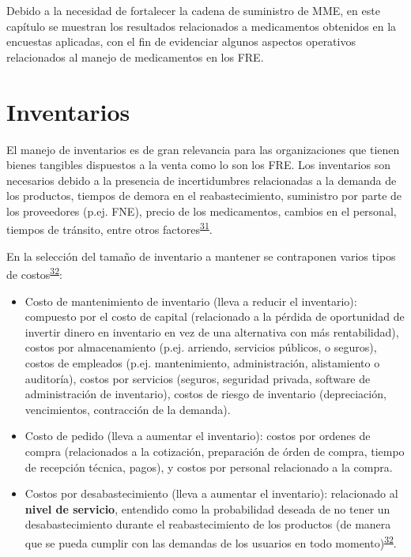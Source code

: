 \documentclass[
]{book}
\begin{document}
Debido a la necesidad de fortalecer la cadena de suministro de MME, en este capítulo se muestran los resultados relacionados a medicamentos obtenidos en la encuestas aplicadas, con el fin de evidenciar algunos aspectos operativos relacionados al manejo de medicamentos en los FRE.

\hypertarget{inventarios}{%
\section{Inventarios}\label{inventarios}}


El manejo de inventarios es de gran relevancia para las organizaciones que tienen bienes tangibles dispuestos a la venta como lo son los FRE. Los inventarios son necesarios debido a la presencia de incertidumbres relacionadas a la demanda de los productos, tiempos de demora en el reabastecimiento, suministro por parte de los proveedores (p.ej. FNE), precio de los medicamentos, cambios en el personal, tiempos de tránsito, entre otros factores\textsuperscript{\protect\hyperlink{ref-Nahmias2007}{31}}.

En la selección del tamaño de inventario a mantener se contraponen varios tipos de costos\textsuperscript{\protect\hyperlink{ref-Krajewski2016}{32}}:

\begin{itemize}
\item
  Costo de mantenimiento de inventario (lleva a reducir el inventario): compuesto por el costo de capital (relacionado a la pérdida de oportunidad de invertir dinero en inventario en vez de una alternativa con más rentabilidad), costos por almacenamiento (p.ej. arriendo, servicios públicos, o seguros), costos de empleados (p.ej. mantenimiento, administración, alistamiento o auditoría), costos por servicios (seguros, seguridad privada, software de administración de inventario), costos de riesgo de inventario (depreciación, vencimientos, contracción de la demanda).
\item
  Costo de pedido (lleva a aumentar el inventario): costos por ordenes de compra (relacionados a la cotización, preparación de órden de compra, tiempo de recepción técnica, pagos), y costos por personal relacionado a la compra.
\item
  Costos por desabastecimiento (lleva a aumentar el inventario): relacionado al \textbf{nivel de servicio}, entendido como la probabilidad deseada de no tener un desabastecimiento durante el reabastecimiento de los productos (de manera que se pueda cumplir con las demandas de los usuarios en todo momento)\textsuperscript{\protect\hyperlink{ref-Krajewski2016}{32}}.
\end{itemize}
\end{document}
